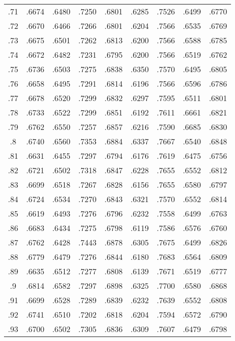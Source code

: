 \documentclass[a4paper,10pt]{article} %
\begin{document}
\begin{tabular} {ccccccccc}
    .71  & .6674 & .6480 & .7250 & .6801 & .6285 & .7526 & .6499 & .6770  \\
    .72  & .6670 & .6466 & .7266 & .6801 & .6204 & .7566 & .6535 & .6769  \\
    .73  & .6675 & .6501 & .7262 & .6813 & .6200 & .7566 & .6588 & .6785  \\
    .74  & .6672 & .6482 & .7231 & .6795 & .6200 & .7566 & .6519 & .6762  \\
    .75  & .6736 & .6503 & .7275 & .6838 & .6350 & .7570 & .6495 & .6805  \\
    .76  & .6658 & .6495 & .7291 & .6814 & .6196 & .7566 & .6596 & .6786  \\
    .77  & .6678 & .6520 & .7299 & .6832 & .6297 & .7595 & .6511 & .6801  \\
    .78  & .6733 & .6522 & .7299 & .6851 & .6192 & .7611 & .6661 & .6821  \\
    .79  & .6762 & .6550 & .7257 & .6857 & .6216 & .7590 & .6685 & .6830  \\
    .8  & .6740 & .6560 & .7353 & .6884 & .6337 & .7667 & .6540 & .6848 \\
    .81  & .6631 & .6455 & .7297 & .6794 & .6176 & .7619 & .6475 & .6756  \\
    .82  & .6721 & .6502 & .7318 & .6847 & .6228 & .7655 & .6552 & .6812  \\
    .83  & .6699 & .6518 & .7267 & .6828 & .6156 & .7655 & .6580 & .6797  \\
    .84  & .6724 & .6534 & .7270 & .6843 & .6321 & .7570 & .6552 & .6814  \\
    .85  & .6619 & .6493 & .7276 & .6796 & .6232 & .7558 & .6499 & .6763  \\
    .86  & .6683 & .6434 & .7275 & .6798 & .6119 & .7586 & .6576 & .6760  \\
    .87  & .6762 & .6428 & .7443 & .6878 & .6305 & .7675 & .6499 & .6826  \\
    .88  & .6779 & .6479 & .7276 & .6844 & .6180 & .7683 & .6564 & .6809  \\
    .89  & .6635 & .6512 & .7277 & .6808 & .6139 & .7671 & .6519 & .6777  \\
    .9  & .6814 & .6582 & .7297 & .6898 & .6325 & .7700 & .6580 & .6868 \\
    .91  & .6699 & .6528 & .7289 & .6839 & .6232 & .7639 & .6552 & .6808  \\
    .92  & .6741 & .6510 & .7202 & .6818 & .6204 & .7594 & .6572 & .6790  \\
    .93  & .6700 & .6502 & .7305 & .6836 & .6309 & .7607 & .6479 & .6798  \\

\end{tabular}
\end{document}
